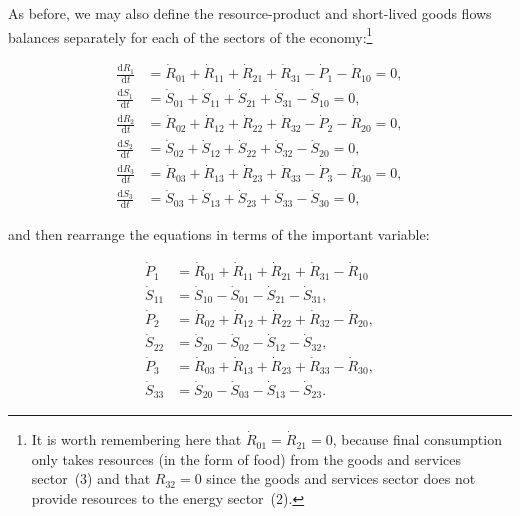As before,
we may also define the resource-product
and short-lived goods flows balances separately
for each of the sectors of the economy:\footnote{It
is worth remembering here that 
$\dot{R}_{01} = \dot{R}_{21} = 0$,
because final consumption only takes resources
(in the form of food) from the goods and services
sector~(3) and that $R_{32} = 0$ since
the goods and services sector does not provide
resources to the energy sector~(2).}

\begin{align}
	\frac{\mathrm{d}R_{1}}{\mathrm{d}t} 	&
	= \dot{R}_{01}
	+ \dot{R}_{11}
	+ \dot{R}_{21}
	+ \dot{R}_{31}
	- \dot{P}_{1}
	- \dot{R}_{10}
	= 0,															\\
\label{eq:C_dS1}
	\frac{\mathrm{d}S_{1}}{\mathrm{d}t} 	&
	= \dot{S}_{01}
	+ \dot{S}_{11}
	+ \dot{S}_{21}
	+ \dot{S}_{31}
	- \dot{S}_{10}
	= 0,															\\
	\frac{\mathrm{d}R_{2}}{\mathrm{d}t} 	&
	= \dot{R}_{02}
	+ \dot{R}_{12}
	+ \dot{R}_{22}
	+ \dot{R}_{32}
	- \dot{P}_{2}
	- \dot{R}_{20}
	= 0,															\\
\label{eq:C_dS2}
	\frac{\mathrm{d}S_{2}}{\mathrm{d}t} 	&
	= \dot{S}_{02}
	+ \dot{S}_{12}
	+ \dot{S}_{22}
	+ \dot{S}_{32}
	- \dot{S}_{20}
	= 0,															\\
	\frac{\mathrm{d}R_{3}}{\mathrm{d}t} 	&
	= \dot{R}_{03}
	+ \dot{R}_{13}
	+ \dot{R}_{23}
	+ \dot{R}_{33}
	- \dot{P}_{3}
	- \dot{R}_{30}
	= 0,															\\
\label{eq:C_dS3}
	\frac{\mathrm{d}S_{3}}{\mathrm{d}t} 	&
	= \dot{S}_{03}
	+ \dot{S}_{13}
	+ \dot{S}_{23}
	+ \dot{S}_{33}
	- \dot{S}_{30}
	= 0,
\end{align}

\noindent{}and then rearrange the equations
in terms of the important variable:

\begin{align}
\label{eq:C_P1a}
	\dot{P}_{1}												&
	= \dot{R}_{01}
	+ \dot{R}_{11}
	+ \dot{R}_{21}
	+ \dot{R}_{31}
	- \dot{R}_{10}											\\
\label{eq:C_S11}
	\dot{S}_{11}											&
	= \dot{S}_{10}
	- \dot{S}_{01}
	- \dot{S}_{21}
	- \dot{S}_{31},										\\
\label{eq:C_P2a}
	\dot{P}_{2}												&
	= \dot{R}_{02}
	+ \dot{R}_{12}
	+ \dot{R}_{22}
	+ \dot{R}_{32}
	- \dot{R}_{20},										\\
\label{eq:C_S22}
	\dot{S}_{22}											&
	= \dot{S}_{20}
	- \dot{S}_{02} 
	- \dot{S}_{12}
	- \dot{S}_{32},										\\
\label{eq:C_P3a}
	\dot{P}_{3}												&
	= \dot{R}_{03}
	+ \dot{R}_{13}
	+ \dot{R}_{23}
	+ \dot{R}_{33}
	- \dot{R}_{30},										\\
\label{eq:C_S33}
	\dot{S}_{33}											&
	= \dot{S}_{20}
	- \dot{S}_{03}
	- \dot{S}_{13}
	- \dot{S}_{23}.	
\end{align}

